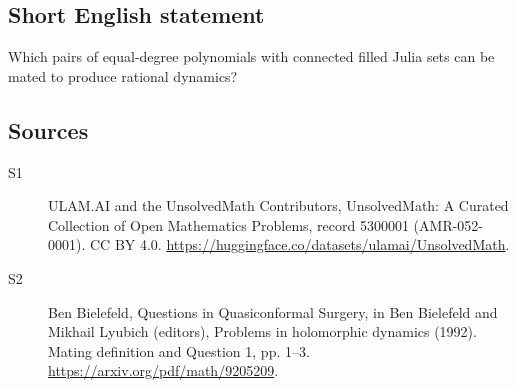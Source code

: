 \documentclass[11pt]{article}
\begin{document}
\subsection{Short English statement}
Which pairs of equal-degree polynomials with connected filled Julia sets can be mated to produce rational dynamics?
\subsection{Sources}
\begin{description}
\item[\hypertarget{source:5300001:1}{S1}] ULAM.AI and the UnsolvedMath Contributors, UnsolvedMath: A Curated Collection of Open Mathematics Problems, record 5300001 (AMR-052-0001). CC BY 4.0. \url{https://huggingface.co/datasets/ulamai/UnsolvedMath}.
\item[\hypertarget{source:5300001:2}{S2}] Ben Bielefeld, Questions in Quasiconformal Surgery, in Ben Bielefeld and Mikhail Lyubich (editors), Problems in holomorphic dynamics (1992). Mating definition and Question 1, pp. 1–3. \url{https://arxiv.org/pdf/math/9205209}.
\end{description}
\label{end:5300001}
\end{document}
